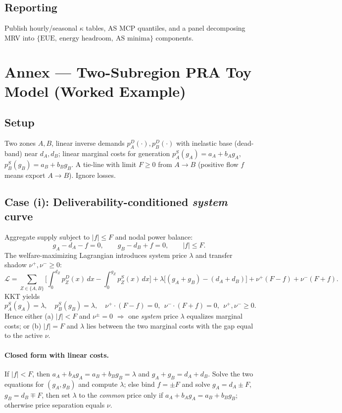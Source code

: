 \documentclass[11pt]{article}
\numberwithin{equation}{section}
\theoremstyle{definition}
\theoremstyle{remark}
\begin{document}
\subsection{ Reporting}
Publish hourly/seasonal $\kappa$ tables, AS MCP quantiles, and a panel decomposing MRV into $\{\text{EUE},\ \text{energy headroom},\ \text{AS minima}\}$ components.

\section{Annex  — Two-Subregion PRA Toy Model (Worked Example)}
\label{annex:L}

\subsection{ Setup}
Two zones $A,B$, linear inverse demands $p^D_A(\cdot),p^D_B(\cdot)$ with inelastic base (dead-band) near $d_A,d_B$; linear marginal costs for generation $p^S_A(g_A)=a_A+b_A g_A$, $p^S_B(g_B)=a_B+b_B g_B$. A tie-line with limit $F\ge 0$ from $A\to B$ (positive flow $f$ means export $A\to B$). Ignore losses. 

\subsection{ Case (i): Deliverability-conditioned \emph{system} curve}
Aggregate supply subject to $|f|\le F$ and nodal power balance:
\[
g_A - d_A - f = 0,\qquad g_B - d_B + f = 0,\qquad |f|\le F.
\]
The welfare-maximizing Lagrangian introduces system price $\lambda$ and transfer shadow $\nu^{+},\nu^{-}\ge 0$:
\[
\mathcal{L}=\sum_{Z\in\{A,B\}}\Big[\int_0^{d_Z} p^D_Z(x)\,dx-\int_0^{g_Z}p^S_Z(x)\,dx\Big] + \lambda\big[(g_A+g_B)-(d_A+d_B)\big] + \nu^{+}(F-f)+\nu^{-}(F+f).
\]
KKT yields
\[
p^S_A(g_A)=\lambda,\quad p^S_B(g_B)=\lambda,\quad \nu^{+}\cdot(F-f)=0,\ \ \nu^{-}\cdot(F+f)=0,\ \ \nu^{+},\nu^{-}\ge 0.
\]
Hence either (a) $|f|<F$ and $\nu^{\pm}=0$ $\Rightarrow$ one \emph{system} price $\lambda$ equalizes marginal costs; or (b) $|f|=F$ and $\lambda$ lies between the two marginal costs with the gap equal to the active $\nu$.

\paragraph{Closed form with linear costs.}
If $|f|<F$, then $a_A+b_A g_A = a_B + b_B g_B = \lambda$ and $g_A+g_B=d_A+d_B$. Solve the two equations for $(g_A,g_B)$ and compute $\lambda$; else bind $f=\pm F$ and solve $g_A=d_A\pm F$, $g_B=d_B\mp F$, then set $\lambda$ to the \emph{common} price only if $a_A+b_A g_A = a_B + b_B g_B$; otherwise price separation equals $\nu$.
\end{document}
